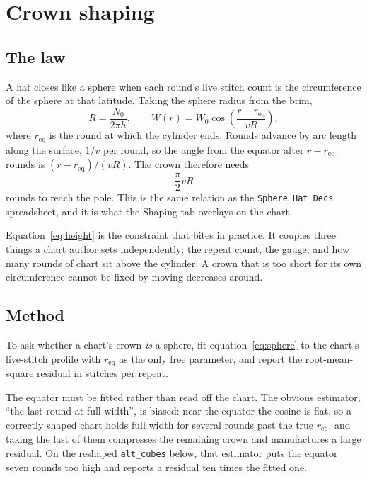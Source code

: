 \documentclass[11pt]{article}
\begin{document}
\section{Crown shaping}

\subsection{The law}

A hat closes like a sphere when each round's live stitch count is the
circumference of the sphere at that latitude. Taking the sphere radius from the
brim,
\begin{equation}
  R = \frac{N_0}{2\pi h},
  \qquad
  W(r) = W_0 \cos\!\left(\frac{r - r_{\text{eq}}}{v R}\right),
  \label{eq:sphere}
\end{equation}
where $r_{\text{eq}}$ is the round at which the cylinder ends. Rounds advance
by arc length along the surface, $1/v$ per round, so the angle from the equator
after $r - r_{\text{eq}}$ rounds is $(r-r_{\text{eq}})/(vR)$. The crown
therefore needs
\begin{equation}
  \frac{\pi}{2} v R
  \label{eq:height}
\end{equation}
rounds to reach the pole. This is the same relation as the
\texttt{Sphere Hat Decs} spreadsheet, and it is what the Shaping tab overlays
on the chart.

Equation~\eqref{eq:height} is the constraint that bites in practice. It couples
three things a chart author sets independently: the repeat count, the gauge,
and how many rounds of chart sit above the cylinder. A crown that is too short
for its own circumference cannot be fixed by moving decreases around.

\subsection{Method}

To ask whether a chart's crown \emph{is} a sphere, fit
equation~\eqref{eq:sphere} to the chart's live-stitch profile with
$r_{\text{eq}}$ as the only free parameter, and report the root-mean-square
residual in stitches per repeat.

The equator must be fitted rather than read off the chart. The obvious
estimator, ``the last round at full width'', is biased: near the equator the
cosine is flat, so a correctly shaped chart holds full width for several rounds
past the true $r_{\text{eq}}$, and taking the last of them compresses the
remaining crown and manufactures a large residual. On the reshaped
\texttt{alt\_cubes} below, that estimator puts the equator seven rounds too
high and reports a residual ten times the fitted one.
\end{document}
